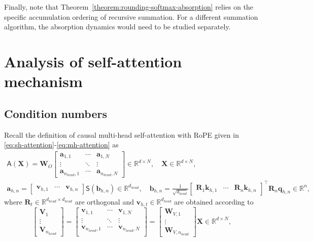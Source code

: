 \documentclass[namedate,webpdf,imanum]{ima-authoring-template}
\newcommand{\Real}{\mathbb{R}}
\newcommand{\Matrix}[1]{\mathbf{#1}}
\newcommand{\trans}{\intercal}
\newcommand{\Layer}[1]{\mathsf{#1}}
\numberwithin{equation}{section}
\begin{document}
Finally, note that Theorem~\ref{theorem:rounding-softmax-absorption} relies on the specific accumulation ordering of recursive summation.
For a different summation algorithm, the absorption dynamics would need to be studied separately.
\section{Analysis of self-attention mechanism}
\label{sec:attention}

\subsection{Condition numbers}
Recall the definition of causal multi-head self-attention with RoPE given in \eqref{eq:sh-attention}-\eqref{eq:mh-attention} as
\begin{gather*}
    \Layer{A}(\Matrix{X}) = \Matrix{W}_O \begin{bmatrix}
        \Matrix{a}_{1,1} & \cdots & \Matrix{a}_{1,N} \\
        \vdots & \ddots & \vdots \\
        \Matrix{a}_{n_{head},1} & \cdots & \Matrix{a}_{n_{head},N}
    \end{bmatrix} \in \Real^{d \times N}, \quad \Matrix{X} \in \Real^{d \times N}, \\
    \Matrix{a}_{h,n} = \begin{bmatrix}
        \Matrix{v}_{h,1} & \cdots & \Matrix{v}_{h,n}
    \end{bmatrix} \Layer{S}(\Matrix{b}_{h,n}) \in \Real^{d_{head}}, \quad \Matrix{b}_{h,n} = \frac{1}{\sqrt{d_{head}}}
    \begin{bmatrix}
        \Matrix{R}_{1}\Matrix{k}_{h,1} & \cdots & \Matrix{R}_{n}\Matrix{k}_{h,n}
    \end{bmatrix}^\trans \Matrix{R}_n \Matrix{q}_{h,n} \in \Real^n,
\end{gather*}
where $\Matrix{R}_t \in \Real^{d_{head} \times d_{head}}$ are orthogonal and $\Matrix{v}_{h,t} \in \Real^{d_{head}}$ are obtained according to
\begin{equation*}
    \begin{bmatrix}
        \Matrix{V}_{1} \\
        \vdots \\
        \Matrix{V}_{n_{head}}
    \end{bmatrix} = \begin{bmatrix}
        \Matrix{v}_{1,1} & \cdots & \Matrix{v}_{1,N} \\
        \vdots & \ddots & \vdots \\
        \Matrix{v}_{n_{head},1} & \cdots & \Matrix{v}_{n_{head},N} \\
    \end{bmatrix} = \begin{bmatrix}
        \Matrix{W}_{V,1} \\
        \vdots \\
        \Matrix{W}_{V,n_{head}}
    \end{bmatrix} \Matrix{X} \in \Real^{d \times N},
\end{equation*}
\end{document}
